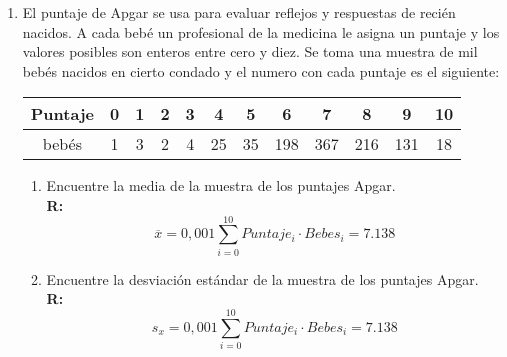 \documentclass[10pt,a4paper]{book}
\begin{document}
\begin{enumerate}
	\item El puntaje de Apgar se usa para evaluar reflejos y respuestas de recién nacidos. A cada bebé un profesional de la medicina le asigna un puntaje y los valores posibles son enteros entre cero y diez. Se toma una muestra de mil bebés nacidos en cierto condado y el numero con cada puntaje es el siguiente:\\
	
	\begin{tabular}{c|ccccccccccc}
	Puntaje	& 0 & 1 & 2 & 3 & 4 & 5 & 6 & 7 & 8 & 9 & 10 \\ 
		\hline 
	bebés & 1 & 3 & 2 & 4 & 25 & 35 & 198 & 367 & 216 & 131 & 18 \\ 
	\end{tabular} 
	
	\begin{enumerate}
		\item Encuentre la media de la muestra de los puntajes Apgar.\\
		\textbf{R:} $$ \overline{x} = 0,001\sum_{i=0}^{10} Puntaje_i \cdot Bebes_i = 7.138  $$

		\item  Encuentre la desviación estándar de la muestra de los puntajes Apgar.\\
		\textbf{R:} $$ s_x = 0,001\sum_{i=0}^{10} Puntaje_i \cdot Bebes_i = 7.138  $$
		
	\end{enumerate}
\end{enumerate}
\end{document}
